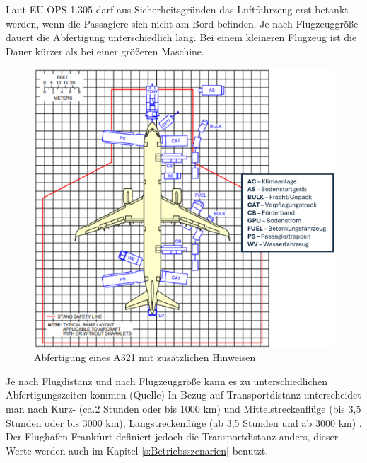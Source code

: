 Laut EU-OPS 1.305 darf aus Sicherheitsgründen das Luftfahrzeug erst betankt werden, 
wenn die Passagiere sich nicht am Bord befinden. 
Je nach Flugzeuggröße dauert die Abfertigung unterschiedlich lang. Bei einem kleineren Flugzeug ist die Dauer 
kürzer als bei einer größeren Maschine. 

\begin{figure}[h]
	\centering
	\includegraphics[width=0.8\linewidth]{Bilder/A321_Abfertigung.png}
	\caption[Abfertigung]{Abfertigung eines A321 \cite{airbus2022a321} mit zusätzlichen Hinweisen}
	\label{abfertigung}
\end{figure}



Je nach Flugdistanz und nach Flugzeuggröße kann es zu unterschiedlichen Abfertigungszeiten kommen (Quelle)
In Bezug auf Transportdistanz unterscheidet man nach Kurz- (ca.2 Stunden oder bis 1000 km) 
und Mittelstreckenflüge (bis 3,5 Stunden oder bis 3000 km), Langstreckenflüge (ab 3,5 Stunden und ab 3000 km) \cite{mensen2013handbuch}.
Der Flughafen Frankfurt definiert jedoch die Transportdistanz anders, dieser Werte werden auch im Kapitel \ref{s:Betriebsszenarien} benutzt.


